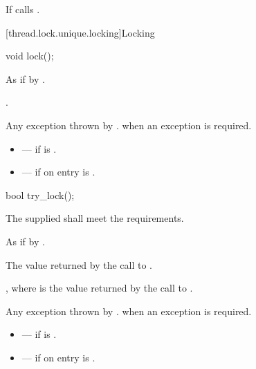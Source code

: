 \begin{itemdescr}
\pnum\effects If  calls .
\end{itemdescr}

[thread.lock.unique.locking]{Locking}

%
\begin{itemdecl}
void lock();
\end{itemdecl}

\begin{itemdescr}
\pnum
\effects As if by .

\pnum
\ensures {}.

\pnum
\throws
Any exception thrown by .  when an exception
is required.

\pnum
\errors
\begin{itemize}
\item {} --- if  is .
\item {} --- if on entry 
is .
\end{itemize}
\end{itemdescr}

%
\begin{itemdecl}
bool try_lock();
\end{itemdecl}

\begin{itemdescr}
\pnum
\requires The supplied  shall meet the 
requirements.

\pnum
\effects As if by .

\pnum\returns The value returned by the call to .

\pnum
\ensures {}, where  is the value returned by
the call to .

\pnum
\throws
Any exception thrown by .  when an exception
is required.

\pnum
\errors
\begin{itemize}
\item {} --- if  is .
\item {} --- if on entry 
is .
\end{itemize}
\end{itemdescr}

